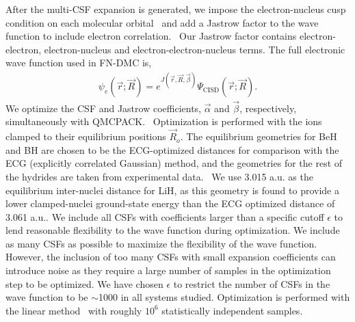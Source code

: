 After the multi-CSF expansion is generated, we impose the electron-nucleus cusp condition on each molecular orbital~\cite{cusp} and add a Jastrow factor to the wave function to include electron correlation.~\cite{Kato} Our Jastrow factor contains electron-electron, electron-nucleus and electron-electron-nucleus terms. The full electronic wave function used in FN-DMC is,
\begin{align}
\psi_e(\vec{r};\vec{R})=e^{J(\vec{r},\vec{R},\vec{\beta})}\Psi_{\text{CISD}}(\vec{r};\vec{R})\label{eq:psie}.
\end{align}
We optimize the CSF and Jastrow coefficients, $\vec{\alpha}$ and $\vec{\beta}$, respectively, simultaneously with QMCPACK.~\cite{QMCPACK_Kim,QMCPACK_Esler} Optimization is performed with the ions clamped to their equilibrium positions $\vec{R}_o$. The equilibrium geometries for BeH and BH are chosen to be the ECG-optimized distances for comparison with the ECG (explicitly correlated Gaussian) method, and the geometries for the rest of the hydrides are taken from experimental data.~\cite{CCCBDB} We use 3.015 a.u. as the equilibrium inter-nuclei distance for LiH, as this geometry is found to provide a lower clamped-nuclei ground-state energy than the ECG optimized distance of 3.061 a.u.. We include all CSFs with coefficients larger than a specific cutoff $\epsilon$ to lend reasonable flexibility to the wave function during optimization. We include as many CSFs as possible to maximize the flexibility of the wave function. However, the inclusion of too many CSFs with small expansion coefficients can introduce noise as they require a large number of samples in the optimization step to be optimized. We have chosen $\epsilon$ to restrict the number of CSFs in the wave function to be $\sim$1000 in all systems studied. Optimization is performed with the linear method~\cite{Umrigar_Linear} with roughly $10^6$ statistically independent samples.%

%

